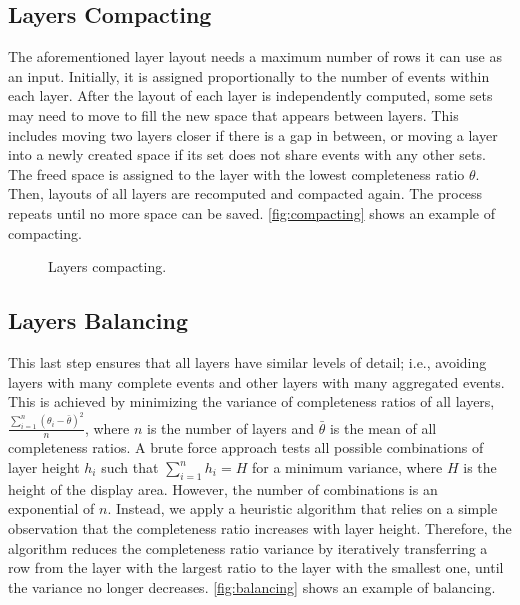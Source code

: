 \subsection{Layers Compacting}
\label{sub:compact}
The aforementioned layer layout needs a maximum number of rows it can use as an input. Initially, it is assigned proportionally to the number of events within each layer. After the layout of each layer is independently computed, some sets may need to move to fill the new space that appears between layers. This includes moving two layers closer if there is a gap in between, or moving a layer into a newly created space if its set does not share events with any other sets. The freed space is assigned to the layer with the lowest completeness ratio $\theta$. Then, layouts of all layers are recomputed and compacted again. The process repeats until no more space can be saved. \autoref{fig:compacting} shows an example of compacting.

\begin{figure}[!htb]
	\centering
	\hfill
	\caption{Layers compacting.}
	\label{fig:compacting}
\end{figure}

\subsection{Layers Balancing}
This last step ensures that all layers have similar levels of detail; i.e., avoiding layers with many complete events and other layers with many aggregated events. This is achieved by minimizing the variance of completeness ratios of all layers,
$\frac{\sum\limits_{i=1}^{n}(\theta_i - \bar{\theta})^2} {n}$, where $n$ is the number of layers and $\bar{\theta}$ is the mean of all completeness ratios. A brute force approach tests all possible combinations of layer height $h_i$ such that $\sum\limits_{i=1}^{n}h_i=H$ for a minimum variance, where $H$ is the height of the display area. However, the number of combinations is an exponential of $n$. Instead, we apply a heuristic algorithm that relies on a simple observation that the completeness ratio increases with layer height. Therefore, the algorithm reduces the completeness ratio variance by iteratively transferring a row from the layer with the largest ratio to the layer with the smallest one, until the variance no longer decreases. \autoref{fig:balancing} shows an example of balancing.

